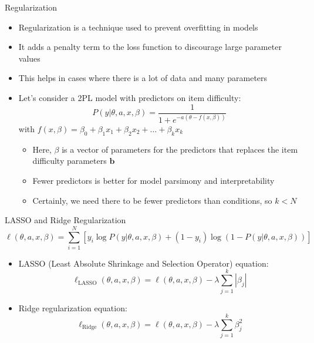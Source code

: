 \documentclass[aspectratio=169]{beamer}
\begin{document}
\begin{frame}{Regularization}
  \begin{itemize}[<+->]
    \item Regularization is a technique used to prevent overfitting in models
    \item It adds a penalty term to the loss function to discourage large parameter values
    \item This helps in cases where there is a lot of data and many parameters
    \item Let's consider a 2PL model with predictors on item difficulty:
    \begin{equation}
      P(y|\theta,a,x,\beta) = \frac{1}{1 + e^{-a(\theta - f(x,\beta))}}
    \end{equation}
    with $f(x,\beta) = \beta_0 + \beta_1 x_1 + \beta_2 x_2 + \ldots + \beta_k x_k$
    \begin{itemize}[<+->]
      \item Here, $\beta$ is a vector of parameters for the predictors that replaces the item difficulty parameters $\mathbf{b}$
      \item Fewer predictors is better for model parsimony and interpretability
      \item Certainly, we need there to be fewer predictors than conditions, so $k < N$ 
    \end{itemize}
  \end{itemize}

\end{frame}

\begin{frame}{LASSO and Ridge Regularization}
  $$\ell(\theta,a,x,\beta) = \sum_{i=1}^{N} \left[y_i \log P(y|\theta,a,x,\beta) + (1-y_i) \log(1 - P(y|\theta,a,x,\beta))\right]$$
  \begin{itemize}[<+->]
    \item LASSO (Least Absolute Shrinkage and Selection Operator) equation:
    \begin{equation}
      \ell_{\text{LASSO}}(\theta,a,x,\beta) = \ell(\theta,a,x,\beta) - \lambda \sum_{j=1}^{k} |\beta_j|
    \end{equation}
    \item Ridge regularization equation:
    \begin{equation}
      \ell_{\text{Ridge}}(\theta,a,x,\beta) = \ell(\theta,a,x,\beta) - \lambda \sum_{j=1}^{k} \beta_j^2
    \end{equation}
  \end{itemize}
\end{frame}
\end{document}
